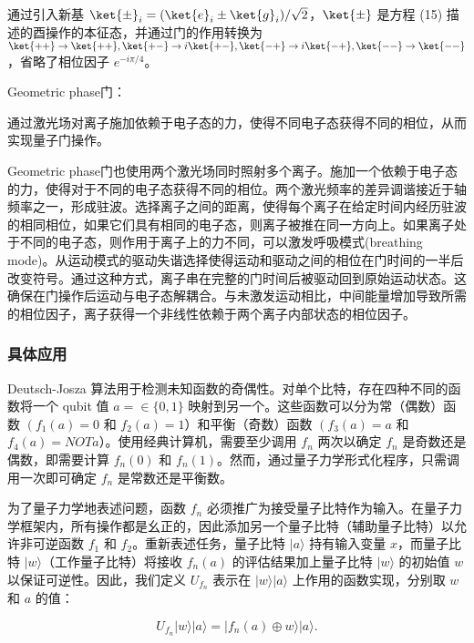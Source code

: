 通过引入新基 $\ket{\pm}_i = (\ket{e}_i \pm \ket{g}_i)/\sqrt{2}$，$\ket{\pm}$ 是方程 (15) 描述的酉操作的本征态，并通过门的作用转换为 $\ket{++} \rightarrow \ket{++}, \ket{+-} \rightarrow i\ket{+-}, \ket{-+} \rightarrow i\ket{-+}, \ket{--} \rightarrow \ket{--}$，省略了相位因子 $e^{-i\pi/4}$。


Geometric phase门：

通过激光场对离子施加依赖于电子态的力，使得不同电子态获得不同的相位，从而实现量子门操作。

Geometric phase门也使用两个激光场同时照射多个离子。施加一个依赖于电子态的力，使得对于不同的电子态获得不同的相位。两个激光频率的差异调谐接近于轴频率之一，形成驻波。选择离子之间的距离，使得每个离子在给定时间内经历驻波的相同相位，如果它们具有相同的电子态，则离子被推在同一方向上。如果离子处于不同的电子态，则作用于离子上的力不同，可以激发呼吸模式(breathing mode)。从运动模式的驱动失谐选择使得运动和驱动之间的相位在门时间的一半后改变符号。通过这种方式，离子串在完整的门时间后被驱动回到原始运动状态。这确保在门操作后运动与电子态解耦合。与未激发运动相比，中间能量增加导致所需的相位因子，离子获得一个非线性依赖于两个离子内部状态的相位因子。

\subsubsection{具体应用}


Deutsch-Josza 算法用于检测未知函数的奇偶性。对单个比特，存在四种不同的函数将一个 qubit 值 $a = \in \{0, 1\}$ 映射到另一个。这些函数可以分为常（偶数）函数 $\left(f_1(a) = 0\right.$ 和 $f_2(a) = 1$）和平衡（奇数）函数 $\left(f_3(a) = a\right.$ 和 $f_4(a) = NOT a$）。使用经典计算机，需要至少调用 $f_n$ 两次以确定 $f_n$ 是奇数还是偶数，即需要计算 $f_n(0)$ 和 $f_n(1)$。然而，通过量子力学形式化程序，只需调用一次即可确定 $f_n$ 是常数还是平衡数。

为了量子力学地表述问题，函数 $f_n$ 必须推广为接受量子比特作为输入。在量子力学框架内，所有操作都是幺正的，因此添加另一个量子比特（辅助量子比特）以允许非可逆函数 $f_1$ 和 $f_2$。重新表述任务，量子比特 $|a\rangle$ 持有输入变量 $x$，而量子比特 $|w\rangle$（工作量子比特）将接收 $f_n(a)$ 的评估结果加上量子比特 $|w\rangle$ 的初始值 $w$ 以保证可逆性。因此，我们定义 $U_{f_n}$ 表示在 $|w\rangle|a\rangle$ 上作用的函数实现，分别取 $w$ 和 $a$ 的值：

\begin{equation}
U_{f_n} |w\rangle |a\rangle = |f_n(a) \oplus w\rangle |a\rangle. \tag{29}
\end{equation}


